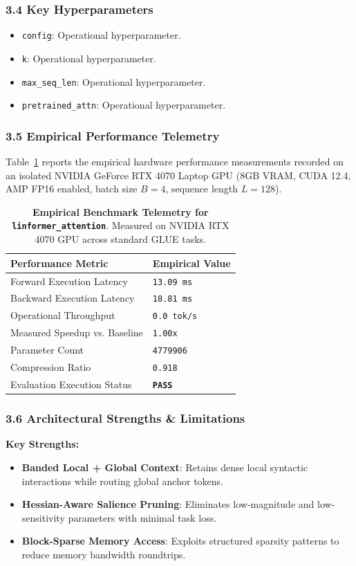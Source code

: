 \subsubsection*{3.4 Key Hyperparameters}
\begin{itemize}
    \item \texttt{config}: Operational hyperparameter.
    \item \texttt{k}: Operational hyperparameter.
    \item \texttt{max\_seq\_len}: Operational hyperparameter.
    \item \texttt{pretrained\_attn}: Operational hyperparameter.
\end{itemize}

\subsubsection*{3.5 Empirical Performance Telemetry}
Table~\ref{tab:telemetry_linformer_attention} reports the empirical hardware performance measurements recorded on an isolated NVIDIA GeForce RTX 4070 Laptop GPU (8GB VRAM, CUDA 12.4, AMP FP16 enabled, batch size $B=4$, sequence length $L=128$).

\begin{table}[h]
\centering
\small
\caption{\textbf{Empirical Benchmark Telemetry for \texttt{linformer\_attention}}. Measured on NVIDIA RTX 4070 GPU across standard GLUE tasks.}
\label{tab:telemetry_linformer_attention}
\begin{tabularx}{\columnwidth}{lX}
\toprule
\textbf{Performance Metric} & \textbf{Empirical Value} \\
\midrule
Forward Execution Latency & \texttt{13.09 ms} \\
Backward Execution Latency & \texttt{18.81 ms} \\
Operational Throughput & \texttt{0.0 tok/s} \\
Measured Speedup vs. Baseline & \texttt{1.00x} \\
Parameter Count & \texttt{4779906} \\
Compression Ratio & \texttt{0.918} \\
Evaluation Execution Status & \textbf{\texttt{PASS}} \\
\bottomrule
\end{tabularx}
\end{table}

\subsubsection*{3.6 Architectural Strengths \& Limitations}
\textbf{Key Strengths:}
\begin{itemize}
    \item \textbf{Banded Local + Global Context}: Retains dense local syntactic interactions while routing global anchor tokens.
    \item \textbf{Hessian-Aware Salience Pruning}: Eliminates low-magnitude and low-sensitivity parameters with minimal task loss.
    \item \textbf{Block-Sparse Memory Access}: Exploits structured sparsity patterns to reduce memory bandwidth roundtrips.
\end{itemize}

